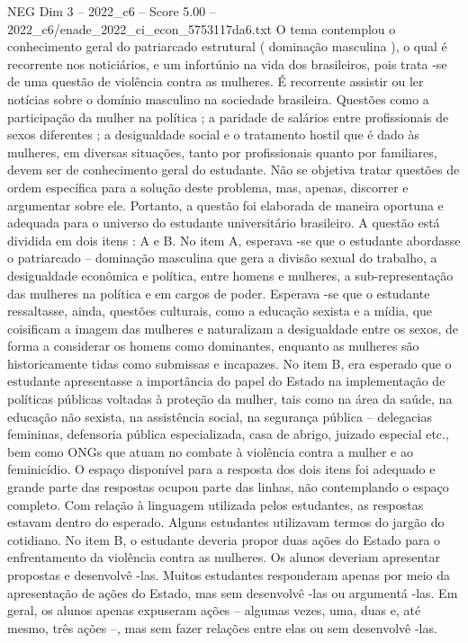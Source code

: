 \begin{textsample}{NEG Dim 3 – 2022\_c6 – Score 5.00 – 2022\_c6/enade\_2022\_ci\_econ\_5753117da6.txt}
O tema contemplou o conhecimento geral do patriarcado estrutural ( dominação masculina ), o qual é recorrente nos noticiários, e um infortúnio na vida dos brasileiros, pois trata -se de uma questão de violência contra as mulheres.
É recorrente assistir ou ler notícias sobre o domínio masculino na sociedade brasileira.
Questões como a participação da mulher na política ; a paridade de salários entre profissionais de sexos diferentes ; a desigualdade social e o tratamento hostil que é dado às mulheres, em diversas situações, tanto por profissionais quanto por familiares, devem ser de conhecimento geral do estudante.
Não se objetiva tratar questões de ordem específica para a solução deste problema, mas, apenas, discorrer e argumentar sobre ele.
Portanto, a questão foi elaborada de maneira oportuna e adequada para o universo do estudante universitário brasileiro.
A questão está dividida em dois itens : A e B.
No item A, esperava -se que o estudante abordasse o patriarcado – dominação masculina que gera a divisão sexual do trabalho, a desigualdade econômica e política, entre homens e mulheres, a sub-representação das mulheres na política e em cargos de poder.
Esperava -se que o estudante ressaltasse, ainda, questões culturais, como a educação sexista e a mídia, que coisificam a imagem das mulheres e naturalizam a desigualdade entre os sexos, de forma a considerar os homens como dominantes, enquanto as mulheres são historicamente tidas como submissas e incapazes.
No item B, era esperado que o estudante apresentasse a importância do papel do Estado na implementação de políticas públicas voltadas à proteção da mulher, tais como na área da saúde, na educação não sexista, na assistência social, na segurança pública – delegacias femininas, defensoria pública especializada, casa de abrigo, juizado especial etc., bem como ONGs que atuam no combate à violência contra a mulher e ao feminicídio.
O espaço disponível para a resposta dos dois itens foi adequado e grande parte das respostas ocupou parte das linhas, não contemplando o espaço completo.
Com relação à linguagem utilizada pelos estudantes, as respostas estavam dentro do esperado.
Alguns estudantes utilizavam termos do jargão do cotidiano.
No item B, o estudante deveria propor duas ações do Estado para o enfrentamento da violência contra as mulheres.
Os alunos deveriam apresentar propostas e desenvolvê -las.
Muitos estudantes responderam apenas por meio da apresentação de ações do Estado, mas sem desenvolvê -las ou argumentá -las.
Em geral, os alunos apenas expuseram ações – algumas vezes, uma, duas e, até mesmo, três ações –, mas sem fazer relações entre elas ou sem desenvolvê -las.

\end{textsample}
